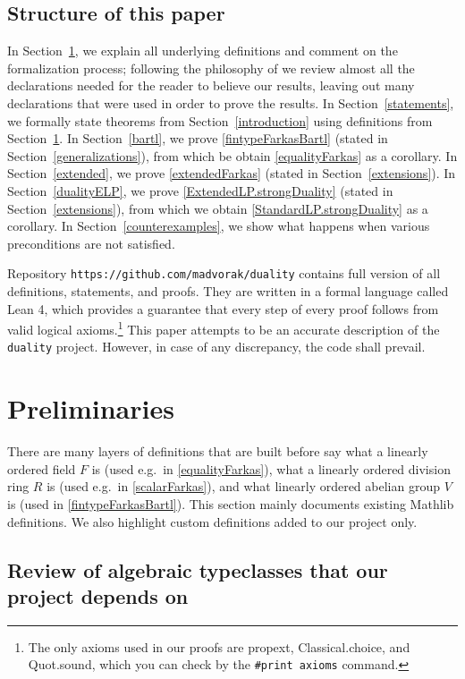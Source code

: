 \documentclass[]{article}
\renewcommand{\.}{\hskip .75pt}
\newcommand{\sekt}[1]{Section~\ref{#1}}
\begin{document}
\subsection{Structure of this paper}

In \sekt{preliminaries}, we explain all underlying definitions and
comment on the formalization process;
following the philosophy of \cite{Believe}
we review almost all the declarations needed for the reader to believe
our results, leaving out many declarations that were used in order
to prove the results.
In \sekt{statements}, we formally state theorems from \sekt{introduction}
using definitions from \sekt{preliminaries}.
In \sekt{bartl}, we prove \ref{fintypeFarkasBartl} (stated in \sekt{generalizations}),
from which be obtain \ref{equalityFarkas} as a corollary.
In \sekt{extended}, we prove \ref{extendedFarkas} (stated in \sekt{extensions}).
In \sekt{dualityELP}, we prove \ref{ExtendedLP.strongDuality}
(stated in \sekt{extensions}), from which we obtain
\ref{StandardLP.strongDuality} as a corollary.
In \sekt{counterexamples}, we show what happens when various preconditions
are not satisfied.

Repository \texttt{https://github.com/madvorak/duality}
contains full version of all definitions, statements,
and proofs. They are written in a formal language called
Lean 4, which provides a guarantee that every step of
every proof follows from valid logical axioms.\footnote{
The only axioms used in our proofs are
propext, Classical.choice, and Quot.sound, which you can
check by the \texttt{\#print axioms} command.}
This paper attempts to be an accurate description of
the \texttt{duality} project.
However, in case of any discrepancy, the code shall prevail.

\section{Preliminaries}
\label{preliminaries}

There are many layers of definitions that are built before say
what a linearly ordered field $F$ is (used e.g.~in \ref{equalityFarkas}),
what a linearly ordered division ring $R$ is (used e.g.~in \ref{scalarFarkas}), and
what linearly ordered abelian group $V$ is (used in \ref{fintypeFarkasBartl}).
This section mainly documents existing Mathlib definitions.
We also highlight custom definitions added to our project only.

\subsection{Review of algebraic typeclasses that our project depends on}
\end{document}

